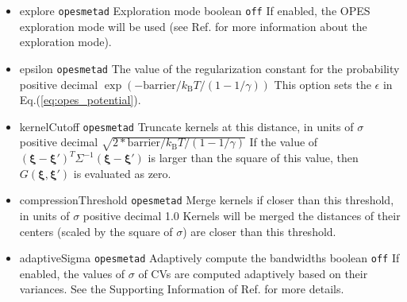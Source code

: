 \begin{itemize}
  \key
    {gaussianSigmaMin}{%
    \texttt{opes{\textunderscore}metad}}{%
    The minimum widths of the kernels (divided by the square root of gamma in exploration mode)}{%
    positive decimal (optional)}{%
    This option sets the minimum $\sigma$ values of the Gaussian kernels. The number of \texttt{gaussianSigmaMin} values should match the number of CVs used by \texttt{colvars}. The OPES method scales down the $\sigma$ during the simulation, and will never shrink $\sigma$ under \texttt{gaussianSigmaMin} if this option is set.}
\item %
  \keydef
    {explore}{%
    \texttt{opes{\textunderscore}metad}}{%
    Exploration mode}{%
    boolean}{%
    \texttt{off}}{%
    If enabled, the OPES exploration mode will be used (see Ref.\cite{Invernizzi2022} for more information about the exploration mode).}
\item %
  \keydef
    {epsilon}{%
    \texttt{opes{\textunderscore}metad}}{%
    The value of the regularization constant for the probability}{%
    positive decimal}{%
    $\exp(-\mathrm{barrier} / k_{\mathrm{B}} T / (1-1/\gamma))$}{%
    This option sets the $\epsilon$ in Eq.(\ref{eq:opes_potential}).}
\item %
  \keydef
    {kernelCutoff}{%
    \texttt{opes{\textunderscore}metad}}{%
    Truncate kernels at this distance, in units of $\sigma$}{%
    positive decimal}{%
    $\sqrt{2*\mathrm{barrier}/k_{\mathrm{B}} T/(1-1/\gamma)}$}{%
    If the value of $(\boldsymbol{\xi}-\boldsymbol{\xi}')^T \Sigma^{-1}(\boldsymbol{\xi}-\boldsymbol{\xi}')$ is larger than the square of this value, then $G(\boldsymbol{\xi}, \boldsymbol{\xi}')$ is evaluated as zero.}
\item %
  \keydef
    {compressionThreshold}{%
    \texttt{opes{\textunderscore}metad}}{%
    Merge kernels if closer than this threshold, in units of $\sigma$}{%
    positive decimal}{%
    1.0}{%
    Kernels will be merged the distances of their centers (scaled by the square of $\sigma$) are closer than this threshold.}
\item %
  \keydef
    {adaptiveSigma}{%
    \texttt{opes{\textunderscore}metad}}{%
    Adaptively compute the bandwidths}{%
    boolean}{%
    \texttt{off}}{%
    If enabled, the values of $\sigma$ of CVs are computed adaptively based on their variances. See the Supporting Information of Ref.\cite{Invernizzi2022} for more details.}

\end{itemize}
